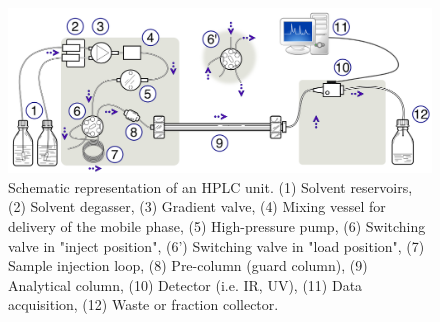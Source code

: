 \begin{figure}[htb]
	\centering
	\includegraphics[width=\textwidth]{figures/mlh/HPLC.png}
	\caption{Schematic representation of an HPLC unit. (1) Solvent reservoirs, (2) Solvent degasser, (3) Gradient valve, (4) Mixing vessel for delivery of the mobile phase, (5) High-pressure pump, (6) Switching valve in "inject position", (6') Switching valve in "load position", (7) Sample injection loop, (8) Pre-column (guard column), (9) Analytical column, (10) Detector (i.e. IR, UV), (11) Data acquisition, (12) Waste or fraction collector.\cite{wiki_hplc}}
	\label{fig:HPLC}
\end{figure}

